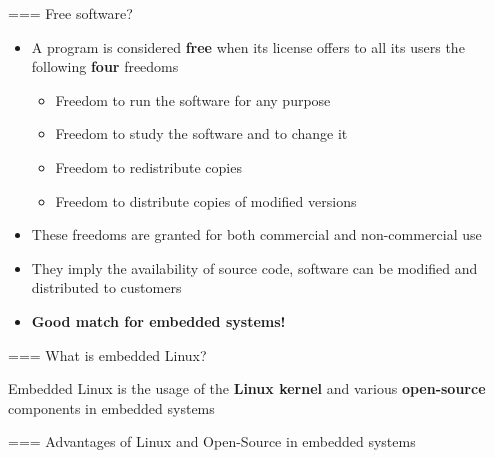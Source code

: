 === Free software?
  \begin{itemize}
  \item A program is considered {\bf free} when its license offers to
    all its users the following {\bf four} freedoms
    \begin{itemize}
    \item Freedom to run the software for any purpose
    \item Freedom to study the software and to change it
    \item Freedom to redistribute copies
    \item Freedom to distribute copies of modified versions
    \end{itemize}
  \item These freedoms are granted for both commercial and
    non-commercial use
  \item They imply the availability of source code, software can be
    modified and distributed to customers
  \item {\bf Good match for embedded systems!}
  \end{itemize}


=== {What is embedded Linux?}
  \huge
  \begin{center}
    Embedded Linux is the usage of the {\bf Linux kernel} and various
    {\bf open-source} components in embedded systems
  \end{center}


=== Advantages of Linux and Open-Source in embedded systems
  \footnotesize
  
